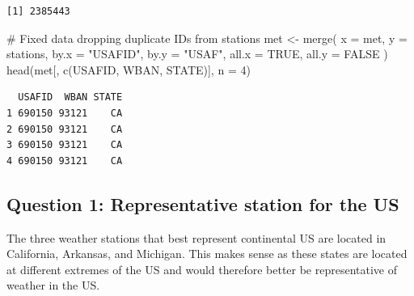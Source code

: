 \documentclass[
  letterpaper,
  DIV=11,
  numbers=noendperiod]{scrartcl}
\newenvironment{Shaded}{\begin{snugshade}}{\end{snugshade}}
\newcommand{\AttributeTok}[1]{\textcolor[rgb]{0.40,0.45,0.13}{#1}}
\newcommand{\CommentTok}[1]{\textcolor[rgb]{0.37,0.37,0.37}{#1}}
\newcommand{\ConstantTok}[1]{\textcolor[rgb]{0.56,0.35,0.01}{#1}}
\newcommand{\DecValTok}[1]{\textcolor[rgb]{0.68,0.00,0.00}{#1}}
\newcommand{\FunctionTok}[1]{\textcolor[rgb]{0.28,0.35,0.67}{#1}}
\newcommand{\NormalTok}[1]{\textcolor[rgb]{0.00,0.23,0.31}{#1}}
\newcommand{\OtherTok}[1]{\textcolor[rgb]{0.00,0.23,0.31}{#1}}
\newcommand{\SpecialCharTok}[1]{\textcolor[rgb]{0.37,0.37,0.37}{#1}}
\newcommand{\StringTok}[1]{\textcolor[rgb]{0.13,0.47,0.30}{#1}}
\begin{document}
\begin{verbatim}
[1] 2385443
\end{verbatim}

\begin{Shaded}
\end{Shaded}

\begin{Shaded}
\begin{Highlighting}[]
\CommentTok{\# Fixed data dropping duplicate IDs from stations}
\NormalTok{met }\OtherTok{\textless{}{-}} \FunctionTok{merge}\NormalTok{(}
  \AttributeTok{x     =}\NormalTok{ met,      }
  \AttributeTok{y     =}\NormalTok{ stations, }
  \AttributeTok{by.x  =} \StringTok{"USAFID"}\NormalTok{,}
  \AttributeTok{by.y  =} \StringTok{"USAF"}\NormalTok{, }
  \AttributeTok{all.x =} \ConstantTok{TRUE}\NormalTok{,      }
  \AttributeTok{all.y =} \ConstantTok{FALSE}
\NormalTok{  )}
\FunctionTok{head}\NormalTok{(met[, }\FunctionTok{c}\NormalTok{(}\StringTok{\textquotesingle{}USAFID\textquotesingle{}}\NormalTok{, }\StringTok{\textquotesingle{}WBAN\textquotesingle{}}\NormalTok{, }\StringTok{\textquotesingle{}STATE\textquotesingle{}}\NormalTok{)], }\AttributeTok{n =} \DecValTok{4}\NormalTok{)}
\end{Highlighting}
\end{Shaded}

\begin{verbatim}
  USAFID  WBAN STATE
1 690150 93121    CA
2 690150 93121    CA
3 690150 93121    CA
4 690150 93121    CA
\end{verbatim}

\subsection{Question 1: Representative station for the
US}\label{question-1-representative-station-for-the-us}

The three weather stations that best represent continental US are
located in California, Arkansas, and Michigan. This makes sense as these
states are located at different extremes of the US and would therefore
better be representative of weather in the US.
\end{document}
